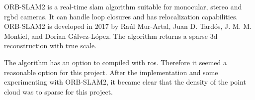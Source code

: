ORB\hyp{}SLAM2 is a real\hyp{}time \acs{slam} algorithm suitable for monocular, stereo and \acs{rgbd} cameras. It can handle loop closures and has relocalization capabilities. ORB-SLAM2 is developed in 2017 by Ra\'ul Mur\hyp{}Artal, Juan D. Tard\'os, J. M. M. Montiel, and Dorian G\'alvez\hyp{}L\'opez. The algorithm returns a sparse \acs{3d} reconstruction with true scale. \cite{murORB2}

The algorithm has an option to compiled with \acs{ros}. Therefore it seemed a reasonable option for this project. After the implementation and some experimenting with ORB\hyp{}SLAM2, it became clear that the density of the point cloud was to sparse for this project.